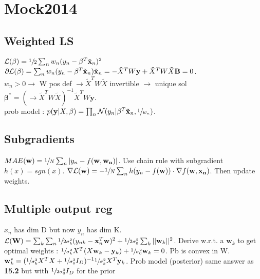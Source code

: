 \section{Mock2014}
\subsection{Weighted LS}
$\mathcal{L}(\mathbf{\beta}) = \sfrac{1}{2} \sum_{n}w_n (y_n - \mathbf{\beta}^T \tilde{\mathbf{x}}_n)^2$ \\

$\partial \mathcal{L}(\mathbf{\beta}) = \sum_n w_n(y_n - \mathbf{\beta}^T\tilde{\mathbf{x}}_n) \tilde{\mathbf{x}}_n \newline = -\tilde{X}^T W \mathbf{y} + \tilde{X}^T W \tilde{X} \mathbf{B} = 0$.\\

$w_n > 0 \rightarrow$ W pos def $\rightarrow \tilde{X}^T W \tilde{X}$ invertible $\rightarrow$ unique sol $\mathbf{\beta}^* = (\rightarrow \tilde{X}^T W \tilde{X})^{-1}\tilde{X}^T W \mathbf{y}$.\\
prob model : \newline $p(\mathbf{y} | X, \mathbf{\beta}) = \prod_n \mathcal{N}(y_n | \mathbf{\beta}^T \mathbf{\tilde{x}}_n, \sfrac{1}{w_n})$. 

\subsection{Subgradients}
$MAE(\mathbf{w}) = \sfrac{1}{N} \sum_n |y_n - f(\mathbf{w}, \mathbf{w_n})|$. Use chain rule with subgradient $h(x) = sgn(x)$. \newline $\nabla \mathcal{L}(\mathbf{w}) = - \sfrac{1}{N} \sum_n h(y_n - f(\mathbf{w})) \cdot \nabla f(\mathbf{w}, \mathbf{x_n})$. Then update weights.

\subsection{Multiple output reg}
$x_n$ has dim D but now $y_n$ has dim K. 
$\mathcal{L}(\mathbf{W}) = \sum_k \sum_n \sfrac{1}{2 \sigma^2_k}(y_{nk} -\mathbf{x}^T_n \mathbf{w})^2 + \sfrac{1}{2 \sigma_0^2}\sum_k ||\mathbf{w}_k||^2$. Derive w.r.t. a $\mathbf{w}_k$ to get optimal weights : $\sfrac{1}{ \sigma^2_k} X^T(X \mathbf{w}_k - \mathbf{y}_k) + \sfrac{1}{\sigma_0^2} \mathbf{w}_k = 0$. Pb is convex in W. $\mathbf{w}^*_k = (\sfrac{1}{ \sigma^2_k} X^T X + \sfrac{1}{\sigma_0^2} I_D)^{-1} \sfrac{1}{\sigma^2_k} X^T \mathbf{y}_k$. 
Prob model (posterior) same answer as \textbf{15.2} but with $\sfrac{1}{2 \sigma_0^2} I_D$ for the prior

